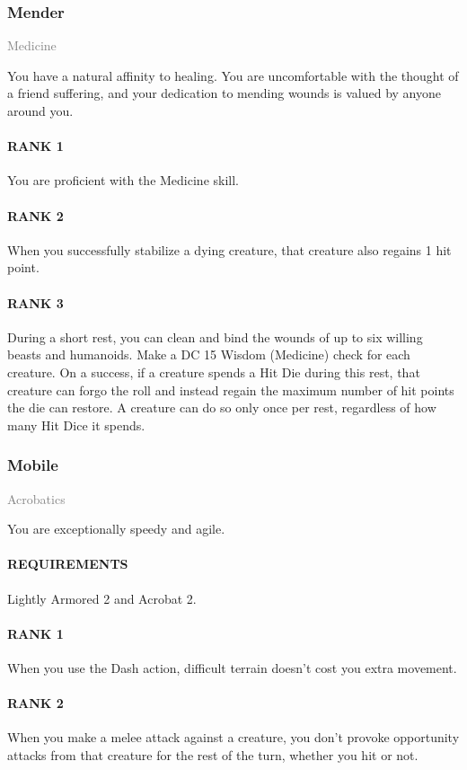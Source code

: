 \subsubsection{Mender} \label{feat::mender}
\small{\textcolor{gray}{Medicine}}

\normalsize
You have a natural affinity to healing.
You are uncomfortable with the thought of a friend suffering, and your dedication to mending wounds is valued by anyone around you.
\paragraph{RANK 1} You are proficient with the Medicine skill.
\paragraph{RANK 2} When you successfully stabilize a dying creature, that creature also regains 1 hit point.
\paragraph{RANK 3} During a short rest, you can clean and bind the wounds of up to six willing beasts and humanoids.
Make a DC 15 Wisdom (Medicine) check for each creature.
On a success, if a creature spends a Hit Die during this rest, that creature can forgo the roll and instead regain the maximum number of hit points the die can restore.
A creature can do so only once per rest, regardless of how many Hit Dice it spends.

\subsubsection{Mobile} \label{feat::mobile}
\small{\textcolor{gray}{Acrobatics}}

\normalsize
You are exceptionally speedy and agile.
\paragraph{REQUIREMENTS} Lightly Armored 2 and Acrobat 2.
\paragraph{RANK 1} When you use the Dash action, difficult terrain doesn't cost you extra movement.
\paragraph{RANK 2} When you make a melee attack against a creature, you don't provoke opportunity attacks from that creature for the rest of the turn, whether you hit or not.
